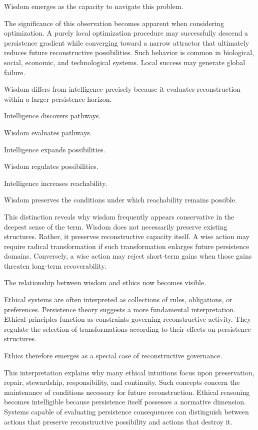 \documentclass[12pt,oneside]{article}
\theoremstyle{definition}
\begin{document}
Wisdom emerges as the capacity to navigate this problem.

The significance of this observation becomes apparent when considering optimization. A purely local optimization procedure may successfully descend a persistence gradient while converging toward a narrow attractor that ultimately reduces future reconstructive possibilities. Such behavior is common in biological, social, economic, and technological systems. Local success may generate global failure.

Wisdom differs from intelligence precisely because it evaluates reconstruction within a larger persistence horizon.

Intelligence discovers pathways.

Wisdom evaluates pathways.

Intelligence expands possibilities.

Wisdom regulates possibilities.

Intelligence increases reachability.

Wisdom preserves the conditions under which reachability remains possible.

This distinction reveals why wisdom frequently appears conservative in the deepest sense of the term. Wisdom does not necessarily preserve existing structures. Rather, it preserves reconstructive capacity itself. A wise action may require radical transformation if such transformation enlarges future persistence domains. Conversely, a wise action may reject short-term gains when those gains threaten long-term recoverability.

The relationship between wisdom and ethics now becomes visible.

Ethical systems are often interpreted as collections of rules, obligations, or preferences. Persistence theory suggests a more fundamental interpretation. Ethical principles function as constraints governing reconstructive activity. They regulate the selection of transformations according to their effects on persistence structures.

Ethics therefore emerges as a special case of reconstructive governance.

This interpretation explains why many ethical intuitions focus upon preservation, repair, stewardship, responsibility, and continuity. Such concepts concern the maintenance of conditions necessary for future reconstruction. Ethical reasoning becomes intelligible because persistence itself possesses a normative dimension. Systems capable of evaluating persistence consequences can distinguish between actions that preserve reconstructive possibility and actions that destroy it.
\end{document}
